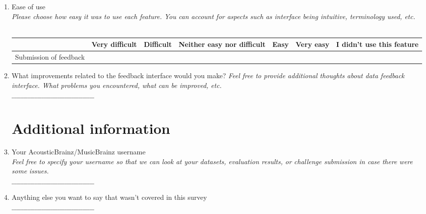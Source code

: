 \begin{enumerate}
    \item Ease of use \\
    \textit{Please choose how easy it was to use each feature. You can account for aspects such as interface being intuitive, terminology used, etc.} \\
    \\
    {\footnotesize
    \begin{tabularx}{\textwidth}{ X | X | l | X | l | l | X }
        & Very difficult & Difficult & Neither easy nor difficult & Easy & Very easy & I didn't use this feature \\
        \hline Submission of feedback & & & & & & \\
    \end{tabularx}
    }

    \item What improvements related to the feedback interface would you make?
    \textit{Feel free to provide additional thoughts about data feedback interface. What problems you encountered, what can be improved, etc.} \\
    $\_\_\_\_\_\_\_\_\_\_\_\_\_\_\_\_\_\_\_\_\_\_\_\_\_\_\_\_\_\_\_\_\_\_\_\_$
    
    \section*{Additional information}

    \item Your AcousticBrainz/MusicBrainz username \\
    \textit{Feel free to specify your username so that we can look at your datasets, evaluation results, or challenge submission in case there were some issues.} \\
    $\_\_\_\_\_\_\_\_\_\_\_\_\_\_\_\_\_\_\_\_\_\_\_\_\_\_\_\_\_\_\_\_\_\_\_\_$
    
    \item Anything else you want to say that wasn't covered in this survey \\
    $\_\_\_\_\_\_\_\_\_\_\_\_\_\_\_\_\_\_\_\_\_\_\_\_\_\_\_\_\_\_\_\_\_\_\_\_$
    
\end{enumerate}
